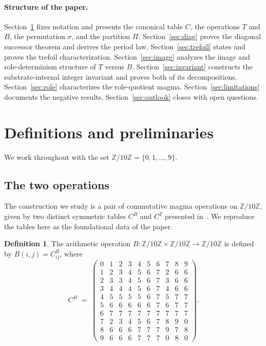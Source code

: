 \documentclass[submission,copyright,creativecommons]{eptcs}
\theoremstyle{plain}
\theoremstyle{definition}
\newtheorem{definition}[theorem]{Definition}
\theoremstyle{remark}
\begin{document}
\paragraph{Structure of the paper.} Section~\ref{sec:def} fixes notation
and presents the canonical table $C$, the operations $T$ and $B$, the
permutation $\sigma$, and the partition $\Pi$. Section~\ref{sec:diag}
proves the diagonal successor theorem and derives the period law.
Section~\ref{sec:trefoil} states and proves the trefoil characterization.
Section~\ref{sec:image} analyzes the image and role-determinism structure
of $T$ versus $B$. Section~\ref{sec:invariant} constructs the
substrate-internal integer invariant and proves both of its decompositions.
Section~\ref{sec:role} characterizes the role-quotient magma.
Section~\ref{sec:limitations} documents the negative results.
Section~\ref{sec:outlook} closes with open questions.

\section{Definitions and preliminaries}\label{sec:def}

We work throughout with the set $\mathbb{Z}/10\mathbb{Z} = \{0, 1, \dots, 9\}$.

\subsection{The two operations}

The construction we study is a pair of commutative magma operations
on $\mathbb{Z}/10\mathbb{Z}$, given by two distinct symmetric tables $C^B$
and $C^T$ presented in~\cite{TIG2026}. We reproduce the tables here as the
foundational data of the paper.

\begin{definition}\label{def:B}
The arithmetic operation $B : \mathbb{Z}/10\mathbb{Z} \times
\mathbb{Z}/10\mathbb{Z} \to \mathbb{Z}/10\mathbb{Z}$ is defined by
$B(i, j) = C^B_{ij}$, where
\[
C^B \;=\;
\begin{pmatrix}
0 & 1 & 2 & 3 & 4 & 5 & 6 & 7 & 8 & 9 \\
1 & 2 & 3 & 4 & 5 & 6 & 7 & 2 & 6 & 6 \\
2 & 3 & 3 & 4 & 5 & 6 & 7 & 3 & 6 & 6 \\
3 & 4 & 4 & 4 & 5 & 6 & 7 & 4 & 6 & 6 \\
4 & 5 & 5 & 5 & 5 & 6 & 7 & 5 & 7 & 7 \\
5 & 6 & 6 & 6 & 6 & 6 & 7 & 6 & 7 & 7 \\
6 & 7 & 7 & 7 & 7 & 7 & 7 & 7 & 7 & 7 \\
7 & 2 & 3 & 4 & 5 & 6 & 7 & 8 & 9 & 0 \\
8 & 6 & 6 & 6 & 7 & 7 & 7 & 9 & 7 & 8 \\
9 & 6 & 6 & 6 & 7 & 7 & 7 & 0 & 8 & 0
\end{pmatrix}.
\]
\end{definition}
\end{document}

